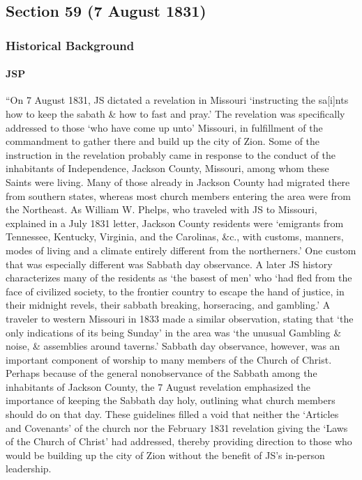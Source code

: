 \subsection{Section 59 (7 August 1831)}
	\label{DC59}
	
	\subsubsection{Historical Background}
		\label{DC59-HB}
		
		\paragraph{JSP}
		
			``On 7 August 1831, JS dictated a revelation in Missouri `instructing the sa[i]nts how to keep the sabath \& how to fast and pray.' The revelation was specifically addressed to those `who have come up unto' Missouri, in fulfillment of the commandment to gather there and build up the city of Zion. Some of the instruction in the revelation probably came in response to the conduct of the inhabitants of Independence, Jackson County, Missouri, among whom these Saints were living. Many of those already in Jackson County had migrated there from southern states, whereas most church members entering the area were from the Northeast. As William W. Phelps, who traveled with JS to Missouri, explained in a July 1831 letter, Jackson County residents were `emigrants from Tennessee, Kentucky, Virginia, and the Carolinas, \&c., with customs, manners, modes of living and a climate entirely different from the northerners.' One custom that was especially different was Sabbath day observance. A later JS history characterizes many of the residents as `the basest of men' who `had fled from the face of civilized society, to the frontier country to escape the hand of justice, in their midnight revels, their sabbath breaking, horseracing, and gambling.' A traveler to western Missouri in 1833 made a similar observation, stating that `the only indications of its being Sunday' in the area was `the unusual Gambling \& noise, \& assemblies around taverns.' Sabbath day observance, however, was an important component of worship to many members of the Church of Christ. Perhaps because of the general nonobservance of the Sabbath among the inhabitants of Jackson County, the 7 August revelation emphasized the importance of keeping the Sabbath day holy, outlining what church members should do on that day. These guidelines filled a void that neither the `Articles and Covenants' of the church nor the February 1831 revelation giving the `Laws of the Church of Christ' had addressed, thereby providing direction to those who would be building up the city of Zion without the benefit of JS’s in-person leadership.
			
